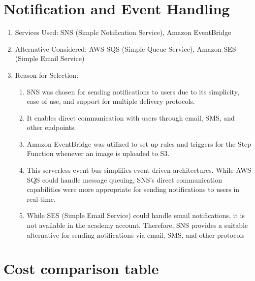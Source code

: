 \section{Notification and Event Handling}
\begin{enumerate}
    \item Services Used: SNS (Simple Notification Service), Amazon EventBridge
    \item  Alternative Considered: AWS SQS (Simple Queue Service), Amazon SES (Simple Email Service)
    \item Reason for Selection: 
    \begin{enumerate}
        \item SNS was chosen for sending notifications to users due to its simplicity, ease of use, and support for multiple delivery protocols. 
        \item  It enables direct communication with users through email, SMS, and other endpoints.
        \item Amazon EventBridge was utilized to set up rules and triggers for the Step Function whenever an image is uploaded to S3. 
        \item This serverless event bus simplifies event-driven architectures. While AWS SQS could handle message queuing, SNS's direct communication capabilities were more appropriate for sending notifications to users in real-time.
        \item  While SES (Simple Email Service) could handle email notifications, it is not available in the academy account. Therefore, SNS provides a suitable alternative for sending notifications via email, SMS, and other protocols
        
    \end{enumerate}
\end{enumerate}

\section{Cost comparison table}

